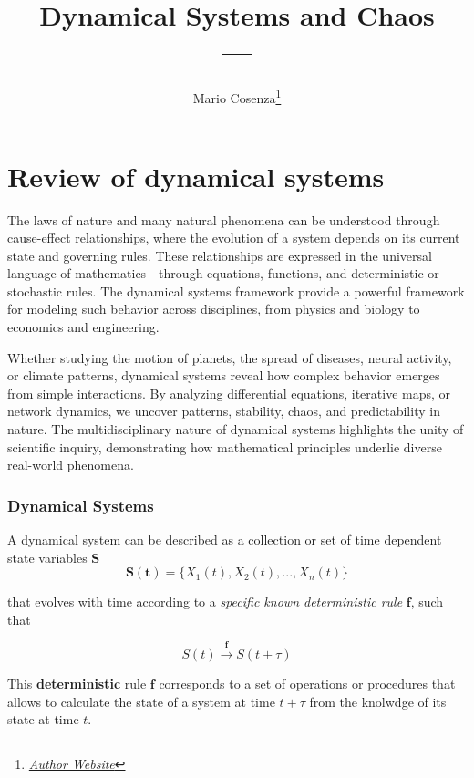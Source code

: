 \documentclass[10pt]{article}
\title{{\Huge Dynamical Systems and Chaos}\\{\Large{---}}}
\author{Mario Cosenza\footnote{\href{https://google.com/}{\textit{Author Website}}}}
\affiliation{Affiliation of Author}
\begin{document}
\maketitle
  \flushbottom
  \newpage
  \pagestyle{fancynotes}
  
  \part{Review of dynamical systems}
  The laws of nature and many natural phenomena can be understood through cause-effect relationships, where the evolution of a 
  system depends on its current state and governing rules. These relationships are expressed in the universal language of 
  mathematics—through equations, functions, and deterministic or stochastic rules. The dynamical systems framework provide a powerful
  framework for modeling such behavior across disciplines, from physics and biology to economics and engineering.  

  Whether studying the motion of planets, the spread of diseases, neural activity, or climate patterns, dynamical systems reveal how 
  complex behavior emerges from simple interactions. By analyzing differential equations, iterative maps, or network dynamics, 
  we uncover patterns, stability, chaos, and predictability in nature. The multidisciplinary nature of dynamical systems highlights 
  the unity of scientific inquiry, demonstrating how mathematical principles underlie diverse real-world phenomena.
  \section{Dynamical Systems}

    \begin{definition}
      A dynamical system can be described as a collection or set of time dependent state variables $\mathbf{S}$
      $$\mathbf{S(t)} = \{ X_1(t), X_2(t), ..., X_n(t) \}$$
      
      that evolves with time according to a \textit{specific known deterministic rule} $\mathbf{f}$, such that
      
      $$S(t) \xrightarrow{\mathbf{f}} S(t + \tau)$$
    \end{definition}
    This \textbf{deterministic} rule $\mathbf{f}$ corresponds to a set of operations or procedures that allows to calculate the state
    of a system at time $t + \tau$ from the knolwdge of its state at time $t$.




  



  
\end{document}
